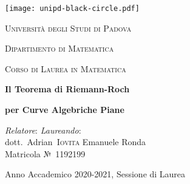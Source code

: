 \begin{titlepage}
	\begin{center}
    	\texttt{[image: unipd-black-circle.pdf]}
    \end{center}
	
	\begin{center}
		\begin{LARGE}
			\textsc{Università degli Studi di Padova}
		\end{LARGE}
    	
    	\vspace{1cm}
		
     	\begin{Large}
     		\textsc{Dipartimento di Matematica }
     		
     		\vspace{.5em}
     		
     		\textsc{Corso di Laurea in Matematica}
     	\end{Large}
	\end{center}
    
    \vfill
     
	\begin{center}
		\begin{Huge}
			\textbf{Il Teorema di Riemann-Roch}
			
			\vspace{.2em}
			
			\textbf{per Curve Algebriche Piane}
		\end{Huge}
	\end{center}

	\vfill
	
	\begin{large}
		\noindent\emph{Relatore}: \hfill \emph{Laureando}: \\
		dott.\ Adrian~\textsc{Iovita} \hfill Emanuele Ronda \\%
		\null\hfill Matricola №~1192199 \hspace{-.72em}
	\end{large}
	
	\vfill
	
    \begin{center}
	    \begin{small}
	    	Anno Accademico 2020-2021, Sessione di Laurea
	    \end{small}
    \end{center}
    
\end{titlepage}
